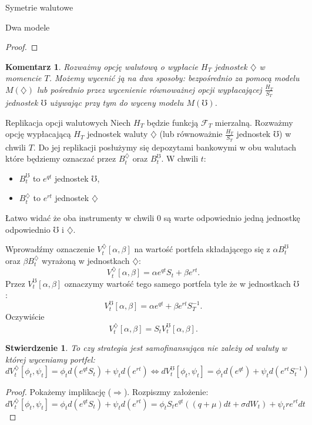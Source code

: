 \documentclass[11pt]{report}
\newtheorem{stw}{Stwierdzenie}[chapter]
\newtheorem{koment}{Komentarz}[chapter]
\begin{document}
\begin{chapter}{Symetrie walutowe}
\begin{section}{Dwa modele}
\begin{proof}
\end{proof}

\begin{koment}
Rozważmy opcję walutową o wypłacie $H_T$ jednostek $\diamondsuit$ w momencie $T$. Możemy wycenić ją na dwa sposoby: bezpośrednio za pomocą modelu $M(\diamondsuit)$ lub pośrednio przez wycenienie równoważnej opcji wypłacającej $\frac{H_T}{S_T}$ jednostek $\mho$ używając przy tym do wyceny modelu $M(\mho)$.  
\end{koment}

\end{section}

\begin{section}{Replikacja opcji walutowych}
Niech $H_T$ będzie funkcją $\mathscr{F}_T$ mierzalną. Rozważmy opcję wypłacającą $H_T$ jednostek waluty $\diamondsuit$ (lub równoważnie $\frac{H_T}{S_T}$ jednostek $\mho$) w chwili $T$.
Do jej replikacji posłużymy się depozytami bankowymi w obu walutach które będziemy oznaczać przez $B^{\diamondsuit}_t$ oraz $B^{\mho}_t$.
W chwili $t$:
\begin{itemize}
\item $B^{\mho}_t$ to $e^{qt}$ jednostek $\mho$,
\item $B^{\diamondsuit}_t$ to $e^{rt}$ jednostek $\diamondsuit$
\end{itemize}
Łatwo widać że oba instrumenty w chwili $0$ są warte odpowiednio jedną jednostkę odpowiednio $\mho$ i $\diamondsuit$.
 
 Wprowadźmy oznaczenie $V_t^{\diamondsuit}[\alpha, \beta]$ na wartość portfela składającego się z $\alpha B^{\mho}_t$ oraz $\beta B^{\diamondsuit}_t$ wyrażoną w jednostkach $\diamondsuit:$
 $$V_t^{\diamondsuit}[\alpha, \beta] = \alpha e^{qt} S_t +\beta e^{rt}.$$ 
 Przez $V_t^{\mho}[\alpha, \beta]$ oznaczymy wartość tego samego portfela tyle że w jednostkach $\mho$: 
$$V_t^{\mho}[\alpha, \beta] = \alpha e^{qt} +\beta e^{rt}S^{-1}_T.$$
Oczywiście 
\begin{equation*}
V_t^{\diamondsuit}[\alpha, \beta] = S_t V_t^{\mho}[\alpha, \beta].
\end{equation*}


\begin{stw} To czy strategia jest samofinansująca nie zależy od waluty w której wyceniamy portfel:
\begin{equation*}
dV_t^{\diamondsuit}[\phi_t, \psi_t] = \phi_t d(e^{qt}S_t) + \psi_t d(e^{rt}) \Leftrightarrow dV_t^{\mho}[\phi_t, \psi_t] = \phi_t d(e^{qt}) + \psi_t d(e^{rt}S_t^{-1})
\end{equation*}
\end{stw}
\begin{proof}
Pokażemy implikację ($\Rightarrow$).
Rozpiszmy założenie:
\begin{equation*}
dV_t^{\diamondsuit}[\phi_t, \psi_t] = \phi_t d(e^{qt}S_t) + \psi_t d(e^{rt}) = \phi_t S_t e^{qt} \left( (q+\mu)dt + \sigma d W_t \right) + \psi_t re^{rt}dt
\end{equation*}


\end{proof}
\end{section}
\end{chapter}
\end{document}
